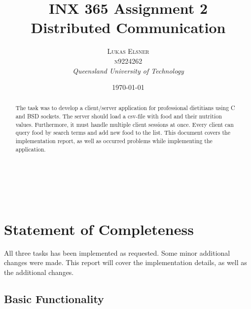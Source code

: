\documentclass[a4paper, 12pt]{scrartcl} %
\title{\textbf{INX 365 Assignment 2}\\ %
Distributed Communication} %
\author{\textsc{Lukas Elsner \\ n9224262} %
\\{\textit{Queensland University of Technology}}} %
\date{\today} %
\makeatletter
\renewcommand{\maketitle}{ %
  \begin{flushright} %
    {\LARGE\@title}\\ %
    \vspace{50pt} %
    {\large\@author} %
    \\\@date %
    \vspace{40pt} %
  \end{flushright}
}
\makeatother
\begin{document}
\maketitle %
\thispagestyle{empty}
\vspace{10em}
\begin{abstract}
The task was to develop a client/server application for professional dietitians
using C and BSD sockets. The server should load a csv-file with food and their
nutrition values. Furthermore, it must handle multiple client sessions at once.
Every client can query food by search terms and add new food to the list. This
document covers the implementation report, as well as occurred problems while
implementing the application.
\end{abstract}
\newpage
\tableofcontents
\newpage

\section{Statement of Completeness}

All three tasks has been implemented as requested. Some minor additional changes
were made. This report will cover the implementation details, as well as the
additional changes.

\subsection{Basic Functionality}
\end{document}
